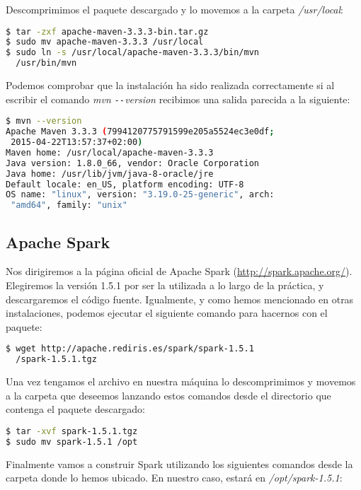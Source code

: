 Descomprimimos el paquete descargado y lo movemos  a la carpeta \textit{/usr/local}:

\begin{lstlisting}[language=bash]
$ tar -zxf apache-maven-3.3.3-bin.tar.gz
$ sudo mv apache-maven-3.3.3 /usr/local
$ sudo ln -s /usr/local/apache-maven-3.3.3/bin/mvn 
  /usr/bin/mvn
\end{lstlisting}


Podemos comprobar que la instalación ha sido realizada correctamente si al escribir el comando \textit{mvn \texttt{-{}-}version} recibimos una salida parecida a la siguiente:

\begin{lstlisting}[language=bash]
$ mvn --version
Apache Maven 3.3.3 (7994120775791599e205a5524ec3e0df;
 2015-04-22T13:57:37+02:00)
Maven home: /usr/local/apache-maven-3.3.3
Java version: 1.8.0_66, vendor: Oracle Corporation
Java home: /usr/lib/jvm/java-8-oracle/jre
Default locale: en_US, platform encoding: UTF-8
OS name: "linux", version: "3.19.0-25-generic", arch:
 "amd64", family: "unix"
\end{lstlisting}


\subsection{Apache Spark}\label{subsec:sparkInstalacion}

Nos dirigiremos a la página oficial de Apache Spark (\url{http://spark.apache.org/}). Elegiremos la versión 1.5.1 por ser la utilizada a lo largo de la práctica, y descargaremos el código fuente. Igualmente, y como hemos mencionado en otras instalaciones, podemos ejecutar el siguiente comando para hacernos con el paquete:

\begin{lstlisting}[language=bash]
$ wget http://apache.rediris.es/spark/spark-1.5.1
  /spark-1.5.1.tgz
\end{lstlisting}


Una vez tengamos el archivo en nuestra máquina lo descomprimimos y movemos a la carpeta que deseemos lanzando estos comandos desde el directorio que contenga el paquete descargado:

\begin{lstlisting}[language=bash]
$ tar -xvf spark-1.5.1.tgz
$ sudo mv spark-1.5.1 /opt
\end{lstlisting}

Finalmente vamos a construir Spark utilizando los siguientes comandos desde la carpeta donde lo hemos ubicado. En nuestro caso, estará en \textit{/opt/spark-1.5.1}:


